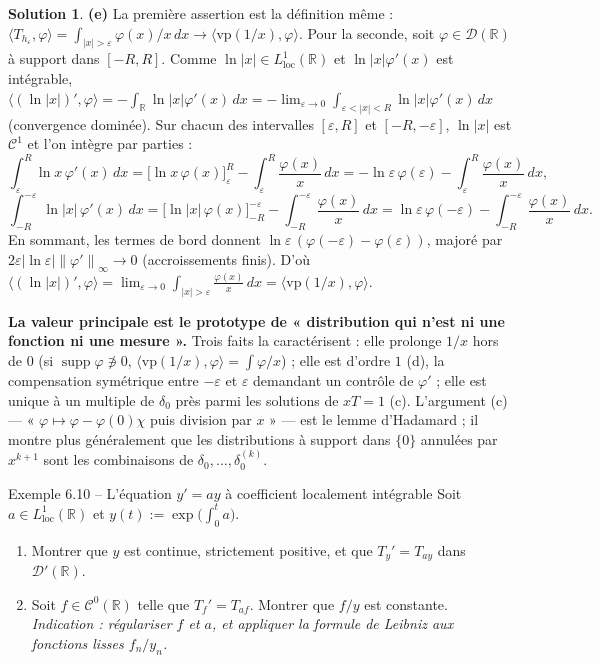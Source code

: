 \documentclass[11pt,a4paper]{article}
\newcommand{\R}{\mathbb{R}}
\newcommand{\norm}[1]{\left\|#1\right\|}
\newcommand{\Cz}{\mathcal{C}^0}
\DeclareMathOperator{\supp}{supp}
\newcommand{\D}{\mathcal{D}}
\theoremstyle{definition}
\newtheorem*{solution}{Solution}
\begin{document}
\begin{solution}
\medskip
\noindent\textbf{(e)} La première assertion est la définition même : $\langle T_{h_\varepsilon},\varphi\rangle=\int_{|x|>\varepsilon}\varphi(x)/x\,dx\to\langle\mathrm{vp}(1/x),\varphi\rangle$. Pour la seconde, soit $\varphi\in\D(\R)$ à support dans $[-R,R]$. Comme $\ln|x|\in L^1_{\mathrm{loc}}(\R)$ et $\ln|x|\varphi'(x)$ est intégrable, $\langle(\ln|x|)',\varphi\rangle=-\int_\R\ln|x|\varphi'(x)\,dx=-\lim_{\varepsilon\to0}\int_{\varepsilon<|x|<R}\ln|x|\varphi'(x)\,dx$ (convergence dominée). Sur chacun des intervalles $[\varepsilon,R]$ et $[-R,-\varepsilon]$, $\ln|x|$ est $\mathcal C^1$ et l'on intègre par parties :
\[
\int_\varepsilon^R\ln x\,\varphi'(x)\,dx=\big[\ln x\,\varphi(x)\big]_\varepsilon^R-\int_\varepsilon^R\frac{\varphi(x)}x\,dx=-\ln\varepsilon\,\varphi(\varepsilon)-\int_\varepsilon^R\frac{\varphi(x)}x\,dx,
\]
\[
\int_{-R}^{-\varepsilon}\ln|x|\,\varphi'(x)\,dx=\big[\ln|x|\,\varphi(x)\big]_{-R}^{-\varepsilon}-\int_{-R}^{-\varepsilon}\frac{\varphi(x)}x\,dx=\ln\varepsilon\,\varphi(-\varepsilon)-\int_{-R}^{-\varepsilon}\frac{\varphi(x)}x\,dx .
\]
En sommant, les termes de bord donnent $\ln\varepsilon\,(\varphi(-\varepsilon)-\varphi(\varepsilon))$, majoré par $2\varepsilon|\ln\varepsilon|\norm{\varphi'}_\infty\to0$ (accroissements finis). D'où $\langle(\ln|x|)',\varphi\rangle=\lim_{\varepsilon\to0}\int_{|x|>\varepsilon}\frac{\varphi(x)}x\,dx=\langle\mathrm{vp}(1/x),\varphi\rangle$.
\end{solution}

\begin{pointcle}
\textbf{La valeur principale est le prototype de « distribution qui n'est ni une fonction ni une mesure ».} Trois faits la caractérisent : elle prolonge $1/x$ hors de $0$ (si $\supp\varphi\not\ni0$, $\langle\mathrm{vp}(1/x),\varphi\rangle=\int\varphi/x$) ; elle est d'ordre $1$ (d), la compensation symétrique entre $-\varepsilon$ et $\varepsilon$ demandant un contrôle de $\varphi'$ ; elle est unique à un multiple de $\delta_0$ près parmi les solutions de $xT=1$ (c). L'argument (c) — « $\varphi\mapsto\varphi-\varphi(0)\chi$ puis division par $x$ » — est le lemme d'Hadamard ; il montre plus généralement que les distributions à support dans $\{0\}$ annulées par $x^{k+1}$ sont les combinaisons de $\delta_0,\dots,\delta_0^{(k)}$.
\end{pointcle}

\begin{exo}{Exemple 6.10 -- L'équation $y'=ay$ à coefficient localement intégrable}
Soit $a\in L^1_{\mathrm{loc}}(\R)$ et $y(t):=\exp\big(\int_0^ta\big)$.
\begin{enumerate}[label=(\alph*)]
  \item Montrer que $y$ est continue, strictement positive, et que $T_y'=T_{ay}$ dans $\D'(\R)$.
  \item Soit $f\in\Cz(\R)$ telle que $T_f'=T_{af}$. Montrer que $f/y$ est constante. \emph{Indication : régulariser $f$ et $a$, et appliquer la formule de Leibniz aux fonctions lisses $f_n/y_n$.}
\end{enumerate}
\end{exo}
\end{document}
